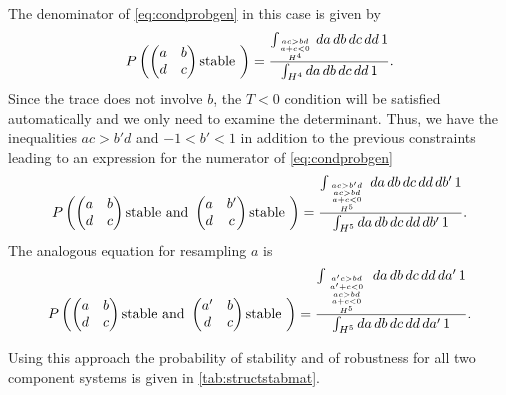 The denominator of \ref{eq:condprobgen} in this case is given by
\begin{align*}
P\left(\begin{pmatrix}
a & b \\
d & c
\end{pmatrix} \textrm{stable } \right) = \frac{\int_{\genfrac{}{}{0pt}{}{\genfrac{}{}{0pt}{}{ac>bd}{a+c<0}}{H^4}} da\,db\,dc\,dd\,1}{\int_{H^4} da\,db\,dc\,dd\,1}.
\end{align*}
Since the trace does not involve $b$, the $T<0$ condition will be satisfied automatically and we only need to examine the determinant. Thus, we have the inequalities $ac > b'd$ and $-1 < b' < 1$ in addition to the previous constraints leading to an expression for the numerator of \ref{eq:condprobgen}
\begin{align*}
P\left(\begin{pmatrix}
a & b \\
d & c
\end{pmatrix} \textrm{stable and } \begin{pmatrix}
a & b' \\
d & c
\end{pmatrix} \textrm{stable } \right) = \frac{\int_{{{ac>b'd \atop ac>bd} \atop a+c<0} \atop H^5} da\,db\,dc\,dd\,db'\,1}{\int_{H^5} da\,db\,dc\,dd\,db'\,1}.
\end{align*}
The analogous equation for resampling $a$ is
\begin{align*}
P\left(\begin{pmatrix}
a & b \\
d & c
\end{pmatrix} \textrm{stable and } \begin{pmatrix}
a' & b \\
d & c
\end{pmatrix} \textrm{stable } \right) = \frac{\int_{{{{a'c>bd \atop a' + c < 0} \atop ac>bd} \atop a+c<0} \atop H^5} da\,db\,dc\,dd\,da'\,1}{\int_{H^5} da\,db\,dc\,dd\,da'\,1}.
\end{align*}

Using this approach the probability of stability and of robustness for all two component systems is given in \ref{tab:structstabmat}.


